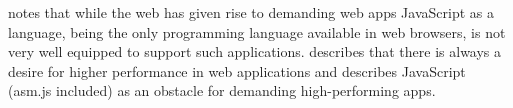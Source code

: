 \textcite{HaasRossbergSchuffTitzerHolmanGohmanWagnerZakaiBastien2017} notes that while the web has given rise to demanding web apps JavaScript as a language, being the only programming language available in web browsers, is not very well equipped to support such applications. \textcite{ReiserBlaser2017} describes that there is always a desire for higher performance in web applications and \textcite{Zakai2018} describes JavaScript (asm.js included) as an obstacle for demanding high-performing apps.









